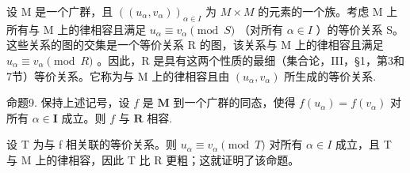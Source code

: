 设 M 是一个广群，且 \(((u_{\alpha}, v_{\alpha}))_{\alpha \in I}\) 为 \(M \times M\) 的元素的一个族。考虑 M 上所有与 M 上的律相容且满足 \(u_{\alpha} \equiv v_{\alpha} \pmod{S}\) （对所有 \(\alpha \in I\) ）的等价关系 S。这些关系的图的交集是一个等价关系 R 的图，该关系与 M 上的律相容且满足 \(u_{\alpha} \equiv v_{\alpha} \pmod{R}\) 。因此，R 是具有这两个性质的最细（集合论，III，§1，第3和7节）等价关系。它称为与 M 上的律相容且由 \((u_{\alpha}, v_{\alpha})\) 所生成的等价关系.

命题9. 保持上述记号，设 \(f\) 是 \(\mathbf{M}\) 到一个广群的同态，使得 \(f(u_{\alpha}) = f(v_{\alpha})\) 对所有 \(\alpha \in \mathbf{I}\) 成立。则 \(f\) 与 \(\mathbf{R}\) 相容.

设 T 为与 f 相关联的等价关系。则 \(u_{\alpha} \equiv v_{\alpha} \pmod{T}\) 对所有 \(\alpha \in I\) 成立，且 T 与 M 上的律相容，因此 T 比 R 更粗；这就证明了该命题。

